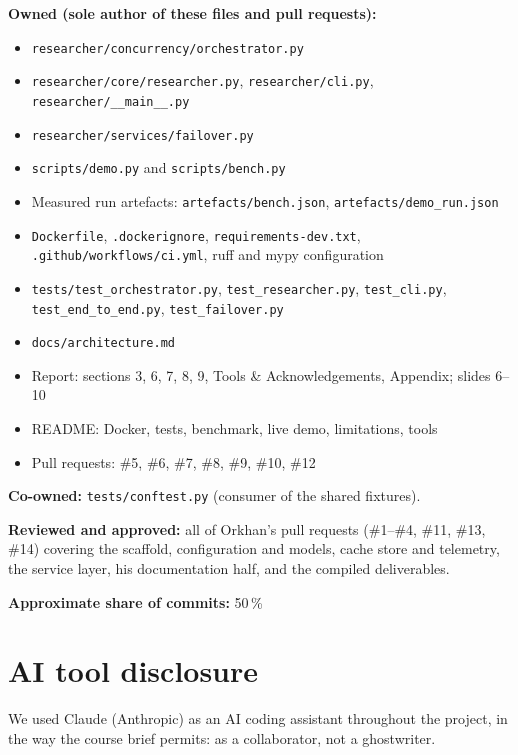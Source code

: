 \documentclass[11pt,a4paper]{article}
\begin{document}
\textbf{Owned (sole author of these files and pull requests):}
\begin{itemize}[topsep=1pt,itemsep=0pt,leftmargin=1.4em]
  \item \texttt{researcher/concurrency/orchestrator.py}
  \item \texttt{researcher/core/researcher.py}, \texttt{researcher/cli.py}, \texttt{researcher/\_\_main\_\_.py}
  \item \texttt{researcher/services/failover.py}
  \item \texttt{scripts/demo.py} and \texttt{scripts/bench.py}
  \item Measured run artefacts: \texttt{artefacts/bench.json}, \texttt{artefacts/demo\_run.json}
  \item \texttt{Dockerfile}, \texttt{.dockerignore}, \texttt{requirements-dev.txt}, \texttt{.github/workflows/ci.yml}, ruff and mypy configuration
  \item \texttt{tests/test\_orchestrator.py}, \texttt{test\_researcher.py}, \texttt{test\_cli.py}, \texttt{test\_end\_to\_end.py}, \texttt{test\_failover.py}
  \item \texttt{docs/architecture.md}
  \item Report: sections 3, 6, 7, 8, 9, Tools \& Acknowledgements, Appendix; slides 6--10
  \item README: Docker, tests, benchmark, live demo, limitations, tools
  \item Pull requests: \#5, \#6, \#7, \#8, \#9, \#10, \#12
\end{itemize}

\textbf{Co-owned:} \texttt{tests/conftest.py} (consumer of the shared fixtures).

\textbf{Reviewed and approved:} all of Orkhan's pull requests (\#1--\#4, \#11, \#13, \#14) covering
the scaffold, configuration and models, cache store and telemetry, the service layer,
his documentation half, and the compiled deliverables.

\textbf{Approximate share of commits:} 50\,\%

\section{AI tool disclosure}

We used Claude (Anthropic) as an AI coding assistant throughout the project, in the
way the course brief permits: as a collaborator, not a ghostwriter.
\end{document}
